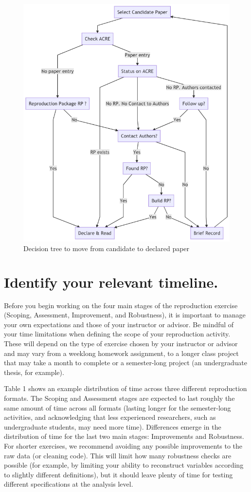 \documentclass[
]{book}
\begin{document}
\begin{figure}
\includegraphics[width=0.8\linewidth]{candidate-to-declared-paper} \caption{Decision tree to move from candidate to declared paper}\label{fig:candidate-paper-dec-tree}
\end{figure}

\hypertarget{identify-your-relevant-timeline.}{%
\section{Identify your relevant timeline.}\label{identify-your-relevant-timeline.}}

Before you begin working on the four main stages of the reproduction exercise (Scoping, Assessment, Improvement, and Robustness), it is important to manage your own expectations and those of your instructor or advisor. Be mindful of your time limitations when defining the scope of your reproduction activity. These will depend on the type of exercise chosen by your instructor or advisor and may vary from a weeklong homework assignment, to a longer class project that may take a month to complete or a semester-long project (an undergraduate thesis, for example).

Table 1 shows an example distribution of time across three different reproduction formats. The Scoping and Assessment stages are expected to last roughly the same amount of time across all formats (lasting longer for the semester-long activities, and acknowledging that less experienced researchers, such as undergraduate students, may need more time). Differences emerge in the distribution of time for the last two main stages: Improvements and Robustness. For shorter exercises, we recommend avoiding any possible improvements to the raw data (or cleaning code). This will limit how many robustness checks are possible (for example, by limiting your ability to reconstruct variables according to slightly different definitions), but it should leave plenty of time for testing different specifications at the analysis level.
\end{document}
